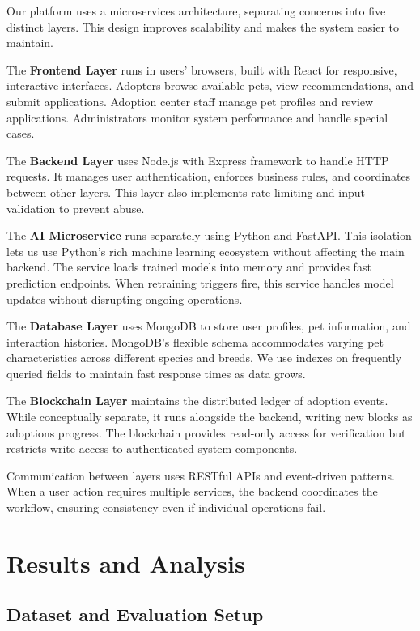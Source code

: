 \documentclass[conference]{IEEEtran}
\begin{document}
Our platform uses a microservices architecture, separating concerns into five distinct layers. This design improves scalability and makes the system easier to maintain.

The \textbf{Frontend Layer} runs in users' browsers, built with React for responsive, interactive interfaces. Adopters browse available pets, view recommendations, and submit applications. Adoption center staff manage pet profiles and review applications. Administrators monitor system performance and handle special cases.

The \textbf{Backend Layer} uses Node.js with Express framework to handle HTTP requests. It manages user authentication, enforces business rules, and coordinates between other layers. This layer also implements rate limiting and input validation to prevent abuse.

The \textbf{AI Microservice} runs separately using Python and FastAPI. This isolation lets us use Python's rich machine learning ecosystem without affecting the main backend. The service loads trained models into memory and provides fast prediction endpoints. When retraining triggers fire, this service handles model updates without disrupting ongoing operations.

The \textbf{Database Layer} uses MongoDB to store user profiles, pet information, and interaction histories. MongoDB's flexible schema accommodates varying pet characteristics across different species and breeds. We use indexes on frequently queried fields to maintain fast response times as data grows.

The \textbf{Blockchain Layer} maintains the distributed ledger of adoption events. While conceptually separate, it runs alongside the backend, writing new blocks as adoptions progress. The blockchain provides read-only access for verification but restricts write access to authenticated system components.

Communication between layers uses RESTful APIs and event-driven patterns. When a user action requires multiple services, the backend coordinates the workflow, ensuring consistency even if individual operations fail.

\section{Results and Analysis}

\subsection{Dataset and Evaluation Setup}
\end{document}
